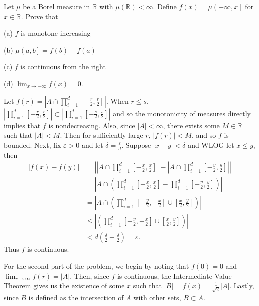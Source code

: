 
\begin{problem}{1}
  Let $\mu$ be a Borel measure in $\mathbb{R}^{}$ with $\mu\left( \mathbb{R}^{} \right) < \infty$.
  Define $f\left( x \right) = \mu\left( - \infty, x  \right]$ for $x \in \mathbb{R}^{}$.
  Prove that

  (a) $f$ is monotone increasing

  (b) $\mu \left( a,b \right] = f\left( b \right) - f\left( a \right)$

  (c) $f$ is continuous from the right

  (d) $\lim_{x \to -\infty} f\left( x  \right) = 0$.
\end{problem}

\begin{solution}
  Let $f(r) = \left| A \cap \prod_{i=1}^{d } [-\frac{r}{2}, \frac{r}{2}] \right|$.
  When $r\leq s$, $\left| \prod_{i=1}^{d } [-\frac{r}{2}, \frac{r}{2}] \right| \subset \left| \prod_{i=1}^{d } [-\frac{s}{2}, \frac{s}{2}] \right|$ and so the monotonicity of measures directly implies that $f$ is nondecreasing.
  Also, since $\left| A \right| < \infty$, there exists some $M \in \mathbb{R}^{}$ such that $\left| A \right| < M$.
  Then for sufficiently large $r$, $\left| f(r) \right| < M$, and so $f$ is bounded.
  Next, fix $\varepsilon > 0$ and let $\delta = \frac{\varepsilon}{d}$.
  Suppose $\left| x - y \right| < \delta$ and WLOG let $x \leq  y$, then
    \begin{align*}
      \left| f(x) - f(y) \right| &= \left| \left| A \cap \prod_{i=1}^{d } [-\frac{x}{2}, \frac{x}{2}] \right| - \left| A \cap \prod_{i=1}^{d } [-\frac{y}{2}, \frac{y}{2}] \right| \right| \\
                                 &= \left| A \cap \left( \prod_{i=1}^{d } [-\frac{x}{2}, \frac{x}{2}] - \prod_{i=1}^{d } [-\frac{y}{2}, \frac{y}{2}] \right) \right| \tag{Class Corollary}\\
                                 &= \left| A \cap \left( \prod_{i=1}^{d } [-\frac{y}{2}, -\frac{x}{2}] \cup  [\frac{x}{2}, \frac{y}{2}] \right) \right| \\
                                 &\leq \left| \left( \prod_{i=1}^{d } [-\frac{y}{2}, -\frac{x}{2}] \cup  [\frac{x}{2}, \frac{y}{2}] \right) \right| \tag{Monotonicity} \\
                                 &< d \left( \frac{\delta}{2} + \frac{\delta}{2} \right) = \varepsilon 
    .\end{align*}
  Thus $f$ is continuous.

  For the second part of the problem, we begin by noting that $f(0) = 0$ and \\$\lim_{r \to \infty}f(r) = \left| A \right| $.
  Then, since $f$ is continuous, the Intermediate Value Theorem gives us the existence of some $x$ such that $\left| B \right| = f(x) = \frac{1}{\sqrt{2} }\left| A \right|$.
  Lastly, since $B$ is defined as the intersection of $A$ with other sets, $B \subset A$.
\end{solution}

